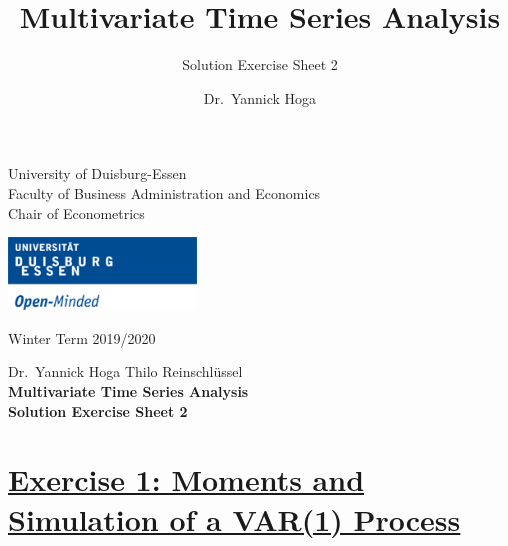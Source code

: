 \documentclass[12pt,a4paper]{article}
\title{Multivariate Time Series Analysis}
\subtitle{Solution Exercise Sheet 2}
\author{Dr.~Yannick Hoga}
\date{}
\newcommand{\tmpsection}[1]{}
\let\tmpsection=\section
\renewcommand{\section}[1]{\tmpsection{\underline{#1}} }
\begin{document}





\restoregeometry



\begin{minipage}{0.6\textwidth}
University of Duisburg-Essen\\
Faculty of Business Administration and Economics\\
Chair of Econometrics\\
\end{minipage}

	\begin{flushright}
	\vspace{-3cm}
	\includegraphics*[width=5cm]{Includes/duelogo_en.png}\\
	\vspace{.125cm}
	\end{flushright}
\hspace{-0.005cm}Winter Term 2019/2020

\vspace{0.05cm}

\begin{center}
	\vspace{.25cm}
	Dr.~Yannick Hoga \hspace{.5cm} Thilo Reinschlüssel \\
	\vspace{.25cm}
	\textbf{\Large{Multivariate Time Series Analysis}}\\
	\vspace{.25cm}
	\textbf{\large{Solution Exercise Sheet 2}}\\
	\vspace{.125cm}
\end{center}





\hypertarget{exercise-1-moments-and-simulation-of-a-var1-process}{%
\section{Exercise 1: Moments and Simulation of a VAR(1)
Process}\label{exercise-1-moments-and-simulation-of-a-var1-process}}
\end{document}
